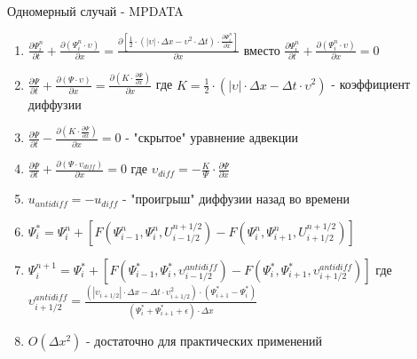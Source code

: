 \begin{frame}{Одномерный случай - MPDATA\cite{smolar:mpdata-1d}}

\begin{enumerate}
  \item $ \frac{\partial \Psi_{i}^{n}}{\partial t} + \frac{\partial (\Psi_{i}^{n} \cdot \upsilon)}{\partial x} = \frac{\partial [\frac{1}{2}\cdot(|\upsilon|\cdot \Delta x - \upsilon^2\cdot \Delta t)\cdot \frac{\partial \Psi_{i}^{n}}{\partial x}]}{\partial x}  $ вместо
      $ \frac{\partial \Psi_{i}^{n}}{\partial t} + \frac{\partial (\Psi_{i}^{n} \cdot \upsilon)}{\partial x} = 0$
  \item $ \frac{\partial \Psi}{\partial t} + \frac{\partial (\Psi \cdot \upsilon)}{\partial x} = \frac{\partial (K\cdot \frac{\partial \Psi}{\partial x})}{\partial x} $ где $K=\frac{1}{2}\cdot(|\upsilon|\cdot \Delta x - \Delta t \cdot \upsilon^2)$ - коэффициент диффузии
  \item $ \frac{\partial \Psi}{\partial t} -  \frac{\partial (K\cdot \frac{\partial \Psi}{\partial x})}{\partial x} = 0$ - "скрытое" уравнение адвекции
  \item $ \frac{\partial \Psi}{\partial t} +  \frac{\partial (\Psi \cdot \upsilon_{diff})}{\partial x} = 0$ где $\upsilon_{diff}=-\frac{K}{\Psi}\cdot \frac{\partial \Psi}{\partial x}$
  \item $u_{antidiff} = -u_{diff}$ - "проигрыш" диффузии назад во времени 
  \item $ \Psi^{*}_i = \Psi^{n}_i + [F(\Psi^{n}_{i-1}, \Psi^{n}_{i}, U^{n+1/2}_{i-1/2}) - F(\Psi^{n}_{i}, \Psi^{n}_{i+1}, U^{n+1/2}_{i+1/2})] $
  \item $ \Psi^{n+1}_i = \Psi^{*}_i + [F(\Psi^{*}_{i-1}, \Psi^{*}_{i}, \upsilon^{antidiff}_{i-1/2}) - F(\Psi^{*}_{i}, \Psi^{*}_{i+1}, \upsilon^{antidiff}_{i+1/2})] $ где $\upsilon_{i+1/2}^{antidiff}=\frac{(|\upsilon_{i+1/2}|\cdot \Delta x - \Delta t\cdot \upsilon^{2}_{i+1/2})\cdot(\Psi^{*}_{i+1}-\Psi^{*}_{i})}{(\Psi^{*}_{i}+\Psi^{*}_{i+1}+\epsilon)\cdot \Delta x}$
  \item $O(\Delta x^2)$ - достаточно для практических применений
\end{enumerate}

\end{frame}

